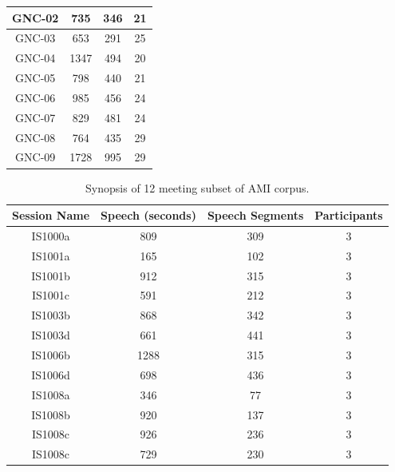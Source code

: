 \documentclass[journal]{IEEEtran}
\begin{document}
\begin{table}[t]
\begin{tabular}{|c|c|c|c|}
		GNC-02       & 735              & 346             & 21           \\ \hline
		GNC-03       & 653              & 291             & 25           \\ \hline
		GNC-04       & 1347             & 494             & 20           \\ \hline
		GNC-05       & 798              & 440             & 21           \\ \hline
		GNC-06       & 985              & 456             & 24           \\ \hline
		GNC-07       & 829              & 481             & 24           \\ \hline
		GNC-08       & 764              & 435             & 29           \\ \hline
		GNC-09       & 1728             & 995             & 29           \\ \hline
	\end{tabular}
\end{table}
\begin{table}[]
	\centering
	\caption{Synopsis of 12 meeting subset of AMI corpus.}
	\label{ami}
	\begin{tabular}{|c|c|c|c|}
		\hline
		Session Name & Speech (seconds) & Speech Segments & Participants \\ \hline
		IS1000a & 809 & 309 & 3 \\ \hline
		IS1001a & 165 & 102 & 3 \\ \hline
		IS1001b & 912 & 315 & 3 \\ \hline
		IS1001c & 591 & 212 & 3 \\ \hline
		IS1003b & 868 & 342 & 3 \\ \hline
		IS1003d & 661 & 441 & 3 \\ \hline
		IS1006b & 1288 & 315 & 3 \\ \hline
		IS1006d & 698 & 436 & 3 \\ \hline
		IS1008a & 346 & 77 & 3 \\ \hline
		IS1008b & 920 & 137 & 3 \\ \hline
		IS1008c & 926 & 236 & 3 \\ \hline
		IS1008c & 729 & 230 & 3 \\ \hline
	\end{tabular}
\end{table}
\end{document}
